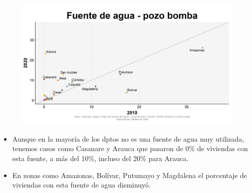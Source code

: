     \begin{figure}[H]
        \caption[Pozo con bomba como fuentes de agua por departamentos - 2010 VS 2020 ]{\label{pozo_bomba_dptos_vs} }
        \begin{center}
        \includegraphics[width=\textwidth,keepaspectratio]{img/var_135_scatter_time.png}
        \end{center}
    \end{figure}
            \begin{itemize}
                    \item Aunque en la mayoría de los dptos no es una fuente de agua muy utilizada, tenemos casos como Casanare y Arauca que pasaron de 0\% de viviendas con esta fuente, a más del 10\%, incluso del 20\% para Arauca.
                    \item En zonas como Amazonas, Bolívar, Putumayo y Magdalena el porcentaje de viviendas con esta fuente de agua disminuyó.
                    \end{itemize}


